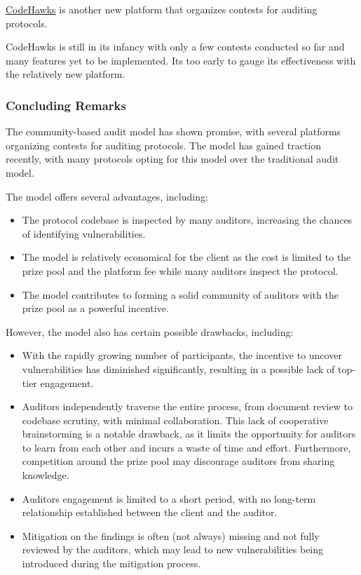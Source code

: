 \documentclass[10pt]{extarticle}
\def\tightlist{}
\begin{document}
\href{https://www.codehawks.com/}{CodeHawks} is another new platform
that organizes contests for auditing protocols.

CodeHawks is still in its infancy with only a few contests conducted so
far and many features yet to be implemented. It\textquotesingle s too
early to gauge its effectiveness with the relatively new platform.

\subsubsection{ Concluding Remarks}\label{335-concluding-remarks}

The community-based audit model has shown promise, with several
platforms organizing contests for auditing protocols. The model has
gained traction recently, with many protocols opting for this model over
the traditional audit model.

The model offers several advantages, including:

\begin{itemize}
\tightlist
\item
  The protocol codebase is inspected by many auditors, increasing the
  chances of identifying vulnerabilities.
\item
  The model is relatively economical for the client as the cost is
  limited to the prize pool and the platform fee while many auditors
  inspect the protocol.
\item
  The model contributes to forming a solid community of auditors with
  the prize pool as a powerful incentive.
\end{itemize}

However, the model also has certain possible drawbacks, including:

\begin{itemize}
\tightlist
\item
  With the rapidly growing number of participants, the incentive to
  uncover vulnerabilities has diminished significantly, resulting in a
  possible lack of top-tier engagement.
\item
  Auditors independently traverse the entire process, from document
  review to codebase scrutiny, with minimal collaboration. This lack of
  cooperative brainstorming is a notable drawback, as it limits the
  opportunity for auditors to learn from each other and incurs a waste
  of time and effort. Furthermore, competition around the prize pool may
  discourage auditors from sharing knowledge.
\item
  Auditors\textquotesingle{} engagement is limited to a short period,
  with no long-term relationship established between the client and the
  auditor.
\item
  Mitigation on the findings is often (not always) missing and not fully
  reviewed by the auditors, which may lead to new vulnerabilities being
  introduced during the mitigation process.
\end{itemize}
\end{document}
